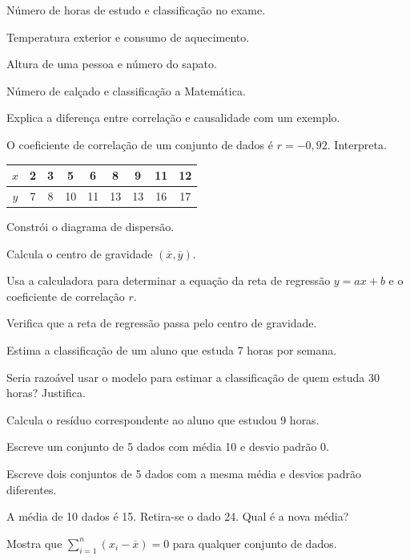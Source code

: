 \documentclass[12pt]{article}
\begin{document}
\begin{exercicios}
  \item Número de horas de estudo e classificação no exame.
  \item Temperatura exterior e consumo de aquecimento.
  \item Altura de uma pessoa e número do sapato.
  \item Número de calçado e classificação a Matemática.
  \item Explica a diferença entre correlação e causalidade com um exemplo.
  \item O coeficiente de correlação de um conjunto de dados é $r = -0{,}92$. Interpreta.
\end{exercicios}


\begin{center}
\begin{tabular}{|c|c|c|c|c|c|c|c|c|}\hline
  $x$ & 2 & 3 & 5 & 6 & 8 & 9 & 11 & 12 \\\hline
  $y$ & 7 & 8 & 10 & 11 & 13 & 13 & 16 & 17 \\\hline
\end{tabular}
\end{center}

\begin{exercicios}
  \item Constrói o diagrama de dispersão.
  \item Calcula o centro de gravidade $(\overline{x}, \overline{y})$.
  \item Usa a calculadora para determinar a equação da reta de regressão $y = ax + b$ e o coeficiente de correlação $r$.
  \item Verifica que a reta de regressão passa pelo centro de gravidade.
  \item Estima a classificação de um aluno que estuda 7 horas por semana.
  \item Seria razoável usar o modelo para estimar a classificação de quem estuda 30 horas? Justifica.
  \item Calcula o resíduo correspondente ao aluno que estudou 9 horas.
\end{exercicios}

\begin{exercicios}
  \item Escreve um conjunto de 5 dados com média 10 e desvio padrão 0.
  \item Escreve dois conjuntos de 5 dados com a mesma média e desvios padrão diferentes.
  \item A média de 10 dados é 15. Retira-se o dado 24. Qual é a nova média?
  \item Mostra que $\sum_{i=1}^{n} (x_i - \overline{x}) = 0$ para qualquer conjunto de dados.
\end{exercicios}
\end{document}
